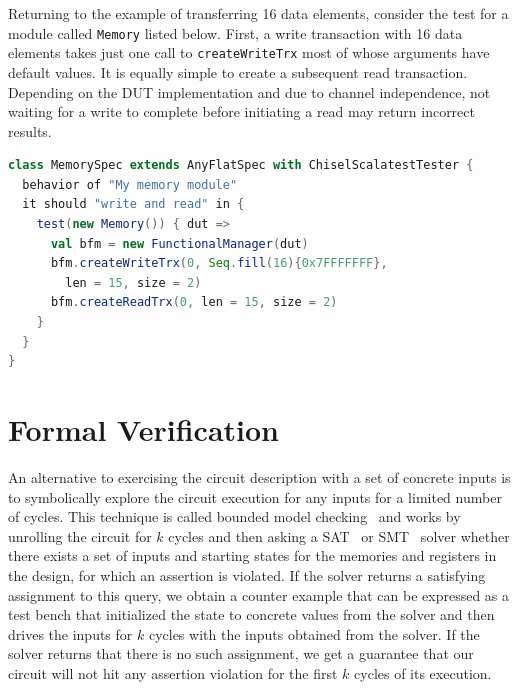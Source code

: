 \documentclass[conference]{IEEEtran}
\begin{document}
Returning to the example of transferring 16 data elements, consider the test for a module called \texttt{Memory} listed below. First, a write transaction with 16 data elements takes just one call to \texttt{createWriteTrx} most of whose arguments have default values. It is equally simple to create a subsequent read transaction. Depending on the DUT implementation and due to channel independence, not waiting for a write to complete before initiating a read may return incorrect results.
\begin{lstlisting}[language=scala, caption={Using the AXI4 BFM with ChiselTest}, label={lst:axitest}]
class MemorySpec extends AnyFlatSpec with ChiselScalatestTester {
  behavior of "My memory module"
  it should "write and read" in {
    test(new Memory()) { dut =>
      val bfm = new FunctionalManager(dut)
      bfm.createWriteTrx(0, Seq.fill(16){0x7FFFFFFF}, 
        len = 15, size = 2)
      bfm.createReadTrx(0, len = 15, size = 2)
    }
  }
}
\end{lstlisting}

\section{Formal Verification}
\label{sec:formal}

An alternative to exercising the circuit description with a set of concrete inputs is to symbolically explore the circuit execution
for any inputs for a limited number of cycles.
This technique is called bounded model checking~\cite{bmc} and works by unrolling the circuit for $k$ cycles and then asking a
SAT~\cite{sat} or SMT~\cite{smt} solver whether there exists a set of inputs and starting states for the memories and registers in the
design, for which an assertion is violated.
If the solver returns a satisfying assignment to this query, we obtain a counter example that can be expressed as a test bench that
initialized the state to concrete values from the solver and then drives the inputs for $k$ cycles with the inputs obtained from the solver.
If the solver returns that there is no such assignment, we get a guarantee that our circuit will not hit any assertion violation for the first $k$
cycles of its execution.
\end{document}
